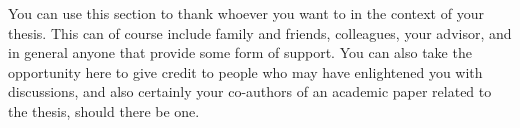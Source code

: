 You can use this section to thank whoever you want to in the
context of your thesis. This can of course include family and friends,
colleagues, your advisor, and in general anyone that provide some 
form of support. You can also take the opportunity here to give credit
to people who may have enlightened you with discussions, and also certainly your co-authors 
of an academic paper related to the thesis, should there be one.